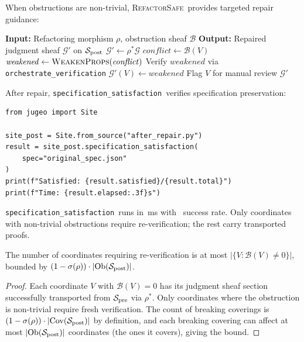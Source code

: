 \documentclass[11pt]{article}
\newcommand{\RefactorSafe}{\textsc{RefactorSafe}}
\newcommand{\SpecSat}{\texttt{specification\_satisfaction}}
\newcommand{\SitePre}{\Site_{\mathrm{pre}}}
\newcommand{\SitePost}{\Site_{\mathrm{post}}}
\newcommand{\RefactorMorph}{\rho}
\newcommand{\ObstructionSheaf}{\mathcal{B}}
\begin{document}
When obstructions are non-trivial, \RefactorSafe\ provides targeted
repair guidance:
\begin{algorithm}[H]
\caption{Obstruction-Guided Repair}
\label{alg:repair}
\begin{algorithmic}[1]
\STATE \textbf{Input:} Refactoring morphism $\RefactorMorph$,
       obstruction sheaf $\ObstructionSheaf$
\STATE \textbf{Output:} Repaired judgment sheaf $\mathcal{G}'$ on
       $\SitePost$
\STATE $\mathcal{G}' \gets \RefactorMorph^{*}\mathcal{G}$ 
\FOR{each $V$ with $\ObstructionSheaf(V) \neq 0$}
  \STATE $\mathit{conflict} \gets \ObstructionSheaf(V)$
  \STATE $\mathit{weakened} \gets \textsc{WeakenProps}(\mathit{conflict})$
  \STATE Verify $\mathit{weakened}$ via \texttt{orchestrate\_verification}
    \STATE $\mathcal{G}'(V) \gets \mathit{weakened}$
  \ELSE
    \STATE Flag $V$ for manual review
  \ENDIF
\ENDFOR
\RETURN $\mathcal{G}'$
\end{algorithmic}
\end{algorithm}

After repair, \SpecSat\ verifies specification preservation:
\begin{lstlisting}[style=jugeo-python]
from jugeo import Site

site_post = Site.from_source("after_repair.py")
result = site_post.specification_satisfaction(
    spec="original_spec.json"
)
print(f"Satisfied: {result.satisfied}/{result.total}")
print(f"Time: {result.elapsed:.3f}s")
\end{lstlisting}
\SpecSat\ runs in \compProfSpecificationSatisfactionMeanMs\,ms with
\compProfSpecificationSatisfactionRate\ success rate.  Only coordinates
with non-trivial obstructions require re-verification; the rest carry
transported proofs.

\begin{proposition}\label{prop:reverif-bound}
The number of coordinates requiring re-verification is at most
$|\{V : \ObstructionSheaf(V) \neq 0\}|$, bounded by
$(1 - \sigma(\RefactorMorph)) \cdot |\Ob(\SitePost)|$.
\end{proposition}

\begin{proof}
Each coordinate $V$ with $\ObstructionSheaf(V) = 0$ has its judgment
sheaf section successfully transported from $\SitePre$ via
$\RefactorMorph^*$.  Only coordinates where the obstruction is
non-trivial require fresh verification.  The count of breaking
coverings is $(1 - \sigma(\RefactorMorph)) \cdot |\Cov(\SitePost)|$
by definition, and each breaking covering can affect at most
$|\Ob(\SitePost)|$ coordinates (the ones it covers), giving the bound.
\end{proof}
\end{document}
